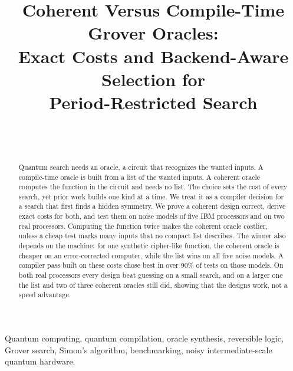 \documentclass[journal]{IEEEtran}
\begin{document}
\title{Coherent Versus Compile-Time Grover Oracles:\\
Exact Costs and Backend-Aware Selection for\\
Period-Restricted Search}

\author{%
  \\
  \\
  }

\maketitle

\begin{abstract}
Quantum search needs an oracle, a circuit that recognizes the wanted inputs. A
compile-time oracle is built from a list of the wanted inputs. A
coherent oracle computes the function in the circuit and needs no list. The choice sets the cost
of every search, yet prior work builds one kind at a time. We
treat it as a compiler decision for a search that first finds a hidden symmetry.
We prove a coherent design correct, derive exact costs for both, and test them on
noise models of five IBM processors and on two real processors. Computing the
function twice makes the coherent oracle costlier, unless a cheap test marks many
inputs that no compact list describes. The winner also depends on the machine:
for one synthetic cipher-like function, the coherent oracle is cheaper on an
error-corrected computer, while the list wins on all five noise models. A
compiler pass built on these costs chose best in over 90\% of tests on those
models. On both real processors every design beat guessing on a small
search, and on a larger one the list and two of three coherent oracles still did,
showing that the designs work, not a speed advantage.
\end{abstract}

\begin{IEEEkeywords}
Quantum computing, quantum compilation, oracle synthesis, reversible logic,
Grover search, Simon's algorithm, benchmarking, noisy intermediate-scale
quantum hardware.
\end{IEEEkeywords}
\end{document}

